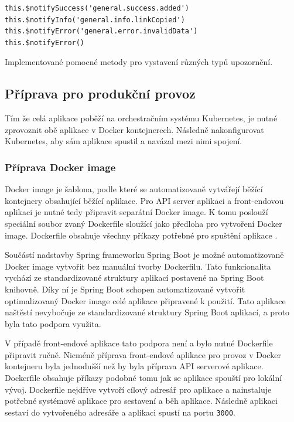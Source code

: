 		\begin{lstlisting}
this.$notifySuccess('general.success.added')
this.$notifyInfo('general.info.linkCopied')
this.$notifyError('general.error.invalidData')
this.$notifyError()
		\end{lstlisting}
		Implementované pomocné metody pro vystavení různých typů upozornění. %

	\subsection{Příprava pro produkční provoz}

	Tím že celá aplikace poběží na orchestračním systému Kubernetes, je nutné zprovoznit obě aplikace v Docker kontejnerech.
	Následně nakonfigurovat Kubernetes, aby sám aplikace spustil a navázal mezi nimi spojení.

		\subsubsection{Příprava Docker image}

		Docker image je šablona, podle které se automatizovaně vytvářejí běžící kontejnery obsahující běžící aplikace.
		Pro \ac{API} server aplikaci a front-endovou aplikaci je nutné tedy připravit separátní Docker image.
		K tomu poslouží speciální soubor zvaný Dockerfile sloužící jako předloha pro vytvoření Docker image.
		Dockerfile obsahuje všechny příkazy potřebné pro spuštění aplikace \cite{dockerfile_reference}.

		Součástí nadstavby Spring frameworku Spring Boot je možné automatizovaně Docker image vytvořit bez manuální tvorby
		Dockerfilu.
		Tato funkcionalita vychází ze standardizované struktury aplikací postavené na Spring Boot knihovně.
		Díky ní je Spring Boot schopen automatizovaně vytvořit optimalizovaný Docker image celé aplikace připravené k
		použití.
		Tato aplikace naštěstí nevybočuje ze standardizované struktury Spring Boot aplikací, a proto byla tato podpora využita.

		V případě front-endové aplikace tato podpora není a bylo nutné Dockerfile připravit ručně.
		Nicméně příprava front-endové aplikace pro provoz v Docker kontejneru byla jednodušší než by byla příprava \ac{API}
		serverové aplikace.
		Dockerfile obsahuje příkazy podobné tomu jak se aplikace spouští pro lokální vývoj.
		Dockerfile nejdříve vytvoří cílový adresář pro aplikace a nainstaluje potřebné systémové aplikace pro sestavení
		a běh aplikace.
		Následně aplikaci sestaví do vytvořeného adresáře a aplikaci spustí na portu \lstinline{3000}.

